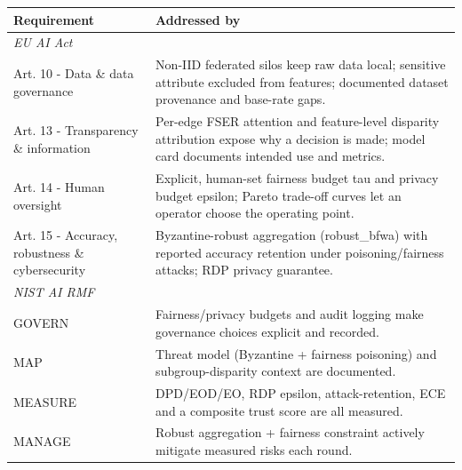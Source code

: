 \begin{tabular}{p{}p{}}
\toprule
Requirement & Addressed by \\
\midrule
\multicolumn{2}{l}{\emph{EU AI Act}} \\
Art. 10 - Data \& data governance & Non-IID federated silos keep raw data local; sensitive attribute excluded from features; documented dataset provenance and base-rate gaps. \\
Art. 13 - Transparency \& information & Per-edge FSER attention and feature-level disparity attribution expose why a decision is made; model card documents intended use and metrics. \\
Art. 14 - Human oversight & Explicit, human-set fairness budget tau and privacy budget epsilon; Pareto trade-off curves let an operator choose the operating point. \\
Art. 15 - Accuracy, robustness \& cybersecurity & Byzantine-robust aggregation (robust\_bfwa) with reported accuracy retention under poisoning/fairness attacks; RDP privacy guarantee. \\
\midrule
\multicolumn{2}{l}{\emph{NIST AI RMF}} \\
GOVERN & Fairness/privacy budgets and audit logging make governance choices explicit and recorded. \\
MAP & Threat model (Byzantine + fairness poisoning) and subgroup-disparity context are documented. \\
MEASURE & DPD/EOD/EO, RDP epsilon, attack-retention, ECE and a composite trust score are all measured. \\
MANAGE & Robust aggregation + fairness constraint actively mitigate measured risks each round. \\
\bottomrule
\end{tabular}